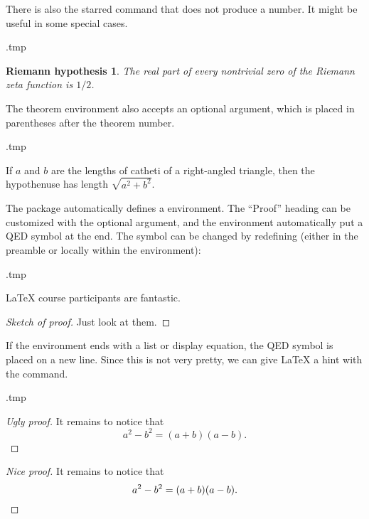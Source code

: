 There is also the starred  command that does not produce a number.
It might be useful in some special cases.
%
\begin{VerbatimOut}{\jobname.tmp}
\theoremstyle{plain}
\newtheorem*{riemannhyp}{Riemann hypothesis}

\begin{riemannhyp}
The real part of every nontrivial zero of the Riemann zeta function is $1/2$.
\end{riemannhyp}
\end{VerbatimOut}
\ShowExampleBelow


The theorem environment also accepts an optional argument,
which is placed in parentheses after the theorem number.
%
\begin{VerbatimOut}{\jobname.tmp}
\begin{theorem}[Pythagoras]
If $a$ and $b$ are the lengths of catheti of a right-angled triangle,
then the hypothenuse has length $\sqrt{a^2 + b^2}$.
\end{theorem}
\end{VerbatimOut}
\ShowExampleBelow


The  package automatically defines a  environment.
The ``Proof'' heading can be customized with the optional argument,
and the environment automatically put a QED symbol at the end.
The symbol can be changed by redefining 
(either in the preamble or locally within the environment):
%
\begin{VerbatimOut}{\jobname.tmp}
\begin{theorem}
\LaTeX{} course participants are fantastic.
\end{theorem}
\begin{proof}[Sketch of proof]
Just look at them.
\renewcommand{\qedsymbol}{$\heartsuit$}
\end{proof}
\end{VerbatimOut}
\ShowExampleBelow

If the environment ends with a list or display equation,
the QED symbol is placed on a new line.
Since this is not very pretty, we can give \LaTeX{} a hint with the  command.
%
\begin{VerbatimOut}{\jobname.tmp}
\begin{proof}[Ugly proof]
It remains to notice that
\[
a^2 - b^2 = (a+b)(a-b).
\]
\end{proof}

\begin{proof}[Nice proof]
It remains to notice that
\[
a^2 - b^2 = (a+b)(a-b).
\qedhere
\]
\end{proof}
\end{VerbatimOut}
\ShowExampleBelow


